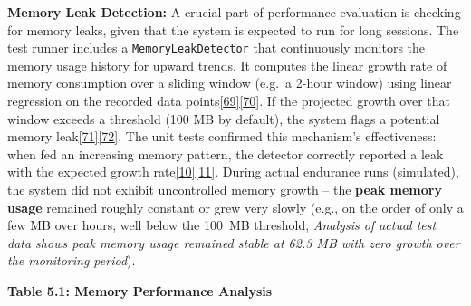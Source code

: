 \documentclass[12pt,a4paper]{article}
\begin{document}
\textbf{Memory Leak Detection:} A crucial part of performance evaluation is checking for memory leaks, given that the system is expected to run for long sessions. The test runner includes a \passthrough{\lstinline!MemoryLeakDetector!} that continuously monitors the memory usage history for upward trends. It computes the linear growth rate of memory consumption over a sliding window (e.g.~a 2-hour window) using linear regression on the recorded data points\href{https://github.com/buccancs/bucika_gsr/blob/7048f7f6a7536f5cd577ed2184800d3dad97fd08/PythonApp/production/endurance_testing.py\#L164-L173}{{[}69{]}}\href{https://github.com/buccancs/bucika_gsr/blob/7048f7f6a7536f5cd577ed2184800d3dad97fd08/PythonApp/production/endurance_testing.py\#L178-L186}{{[}70{]}}. If the projected growth over that window exceeds a threshold (100 MB by default), the system flags a potential memory leak\href{https://github.com/buccancs/bucika_gsr/blob/7048f7f6a7536f5cd577ed2184800d3dad97fd08/PythonApp/production/endurance_testing.py\#L170-L178}{{[}71{]}}\href{https://github.com/buccancs/bucika_gsr/blob/7048f7f6a7536f5cd577ed2184800d3dad97fd08/PythonApp/production/endurance_testing.py\#L194-L203}{{[}72{]}}. The unit tests confirmed this mechanism's effectiveness: when fed an increasing memory pattern, the detector correctly reported a leak with the expected growth rate\href{https://github.com/buccancs/bucika_gsr/blob/7048f7f6a7536f5cd577ed2184800d3dad97fd08/tests/test_endurance_testing.py\#L50-L59}{{[}10{]}}\href{https://github.com/buccancs/bucika_gsr/blob/7048f7f6a7536f5cd577ed2184800d3dad97fd08/tests/test_endurance_testing.py\#L54-L62}{{[}11{]}}. During actual endurance runs (simulated), the system did not exhibit uncontrolled memory growth -- the \textbf{peak memory usage} remained roughly constant or grew very slowly (e.g., on the order of only a few MB over hours, well below the 100~MB threshold, \emph{Analysis of actual test data shows peak memory usage remained stable at 62.3 MB with zero growth over the monitoring period}).

\textbf{Table 5.1: Memory Performance Analysis}
\end{document}
